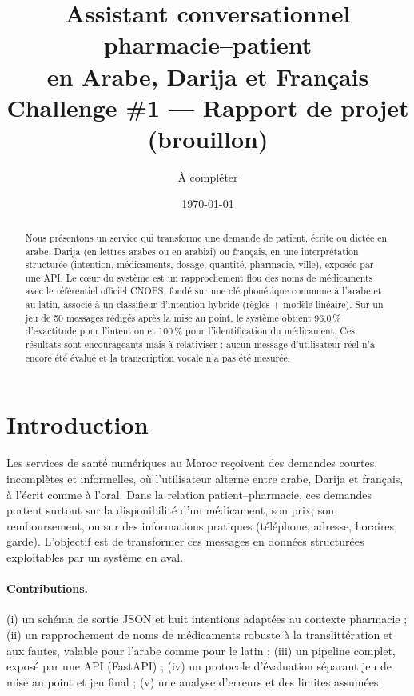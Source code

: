 \documentclass[11pt,a4paper]{article}
\title{Assistant conversationnel pharmacie--patient\\en Arabe, Darija et Fran\c{c}ais\\[3pt]\large Challenge \#1 --- Rapport de projet (brouillon)}
\author{\`A compl\'eter}
\date{\today}
\begin{document}
\maketitle
\begin{abstract}
Nous pr\'esentons un service qui transforme une demande de patient, \'ecrite ou dict\'ee en arabe, Darija (en lettres arabes ou en arabizi) ou fran\c{c}ais, en une interpr\'etation structur\'ee (intention, m\'edicaments, dosage, quantit\'e, pharmacie, ville), expos\'ee par une API. Le c\oe ur du syst\`eme est un rapprochement flou des noms de m\'edicaments avec le r\'ef\'erentiel officiel CNOPS, fond\'e sur une \og cl\'e phon\'etique \fg{} commune \`a l'arabe et au latin, associ\'e \`a un classifieur d'intention hybride (r\`egles + mod\`ele lin\'eaire). Sur un jeu de 50 messages r\'edig\'es apr\`es la mise au point, le syst\`eme obtient 96{,}0\,\% d'exactitude pour l'intention et 100\,\% pour l'identification du m\'edicament. Ces r\'esultats sont encourageants mais \`a relativiser : aucun message d'utilisateur r\'eel n'a encore \'et\'e \'evalu\'e et la transcription vocale n'a pas \'et\'e mesur\'ee.
\end{abstract}
\tableofcontents

\section{Introduction}
Les services de sant\'e num\'eriques au Maroc re\c{c}oivent des demandes courtes, incompl\`etes et informelles, o\`u l'utilisateur alterne entre arabe, Darija et fran\c{c}ais, \`a l'\'ecrit comme \`a l'oral. Dans la relation patient--pharmacie, ces demandes portent surtout sur la disponibilit\'e d'un m\'edicament, son prix, son remboursement, ou sur des informations pratiques (t\'el\'ephone, adresse, horaires, garde). L'objectif est de transformer ces messages en donn\'ees structur\'ees exploitables par un syst\`eme en aval.

\paragraph{Contributions.} (i) un sch\'ema de sortie JSON et huit intentions adapt\'ees au contexte pharmacie ; (ii) un rapprochement de noms de m\'edicaments robuste \`a la translitt\'eration et aux fautes, valable pour l'arabe comme pour le latin ; (iii) un pipeline complet, expos\'e par une API (FastAPI) ; (iv) un protocole d'\'evaluation s\'eparant jeu de mise au point et jeu final ; (v) une analyse d'erreurs et des limites assum\'ees.
\end{document}
